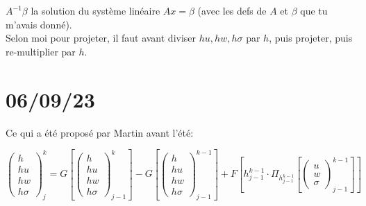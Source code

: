 \documentclass[review,onefignum,onetabnum]{siamart220329}
\begin{document}
$A^{-1} \beta$ la solution du système linéaire $Ax = \beta$ (avec les defs de $A$ et $\beta$ que tu m'avais donné).\\
Selon moi pour projeter, il faut avant diviser $hu, hw, h\sigma$ par $h$, puis projeter, puis re-multiplier par $h$.

\section{06/09/23}

Ce qui a été proposé par Martin avant l'été:

\begin{equation}
    \begin{pmatrix}
        h \\ hu \\ hw \\ h\sigma
    \end{pmatrix}^{k}_{j} =
    G\left[
        \begin{pmatrix}
            h \\ hu \\ hw \\ h\sigma
        \end{pmatrix}^{k}_{j-1}
    \right]
    - G\left[
        \begin{pmatrix}
            h \\ hu \\ hw \\ h\sigma
        \end{pmatrix}^{k-1}_{j-1}
    \right]
    + F\left[ h^{k-1}_{j-1} \cdot \Pi_{h^{k-1}_{j-1}} \left[
        \begin{pmatrix}
            u \\ w \\ \sigma
        \end{pmatrix}^{k-1}_{j-1}
        \right]
    \right]
\end{equation}
\end{document}
